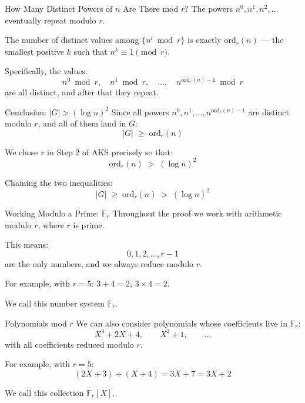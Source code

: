 \documentclass{beamer}
\begin{document}

\begin{frame}{How Many Distinct Powers of $n$ Are There mod $r$?}
The powers $n^0, n^1, n^2, \ldots$ eventually repeat modulo $r$.
\vspace{1em}

The number of distinct values among $\{n^i \bmod r\}$ is exactly
$\mathrm{ord}_r(n)$ --- the smallest positive $k$ such that $n^k \equiv 1 \pmod{r}$.
\vspace{1em}

Specifically, the values:
\[
    n^0 \bmod r,\quad n^1 \bmod r,\quad \ldots,\quad n^{\mathrm{ord}_r(n)-1} \bmod r
\]
are all distinct, and after that they repeat.
\end{frame}


\begin{frame}{Conclusion: $|G| > (\log n)^2$}
Since all powers $n^0, n^1, \ldots, n^{\mathrm{ord}_r(n)-1}$ are distinct
modulo $r$, and all of them land in $G$:
\[
    |G| \;\ge\; \mathrm{ord}_r(n)
\]
\vspace{0.5em}

We chose $r$ in Step 2 of AKS precisely so that:
\[
    \mathrm{ord}_r(n) \;>\; (\log n)^2
\]
\vspace{0.5em}

Chaining the two inequalities:
\[
    \boxed{|G| \;\ge\; \mathrm{ord}_r(n) \;>\; (\log n)^2}
\]
\end{frame}

\begin{frame}{Working Modulo a Prime: $\mathbb{F}_r$}
Throughout the proof we work with arithmetic modulo $r$, where $r$ is prime.

This means:
\[
    0, 1, 2, \ldots, r-1
\]
are the only numbers, and we always reduce modulo $r$.

For example, with $r = 5$: \quad $3 + 4 = 2$, \quad $3 \times 4 = 2$.

We call this number system $\mathbb{F}_r$.
\end{frame}


\begin{frame}{Polynomials mod $r$}
We can also consider polynomials whose coefficients live in $\mathbb{F}_r$:
\[
    X^3 + 2X + 4, \qquad X^2 + 1, \qquad \ldots
\]
with all coefficients reduced modulo $r$.

For example, with $r = 5$:
\[
    (2X + 3) + (X + 4) = 3X + 7 = 3X + 2
\]

We call this collection $\mathbb{F}_r[X]$.
\end{frame}
\end{document}
